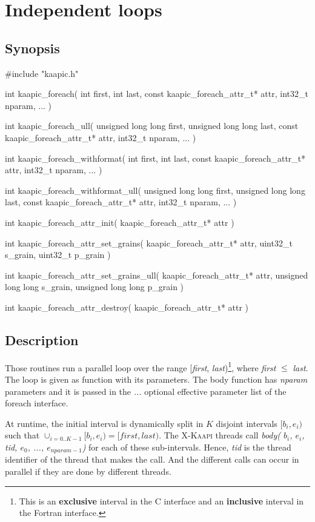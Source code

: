 \documentclass[a4paper, 11pt]{article}
\makeatletter
\newenvironment{apisection}[2][noshortnameprovided]{%
  \newpage
  \section{#2}
  \label{api@#1}
  \newcommand{\api@newpart}[4][noshortpartnameprovided]{%
    \newenvironment{##1}{%
      \subsection{##2}%
      \label{api@#1@##1}%
      ##3%
    }{##4}%
  }%
  \api@newpart[synopsis]{Synopsis}{}{}%
  \api@newpart[call]{Call}{}{}%
  \api@newpart[desc]{Description}{}{}%
  \api@newpart[params]{Parameters}{%
    \let\api@indesc\@empty
    \newcommand{\param}[1]{%
      \def\api@indesc{yes}%
      \begin{description}%
        \renewcommand{\param}[1]{\item[########1]}%
      \item[####1]
      }%
      \newenvironment{parameters}{%
        \begin{description}%
          \renewcommand{\param}[1]{\item[########1]}%
        }{%
        \end{description}%
      }
    }{%
      \ifx\api@indesc\@empty\relax\else%
    \end{description}%
    \fi%
  }%
  \api@newpart[ret]{Return value}{%
    \newcommand{\otherret}{\par\medskip\noindent}%
  }{}%
  \api@newpart[example]{Example}{}{}%
}{}
\newcommand{\kaapi}{\textsc{X-Kaapi}\xspace}
\makeatother
\begin{document}
\begin{apisection}[loop]{Independent loops}

  \begin{synopsis}
    \begin{code}
#include "kaapic.h"

int kaapic_foreach( 
  int first, 
  int last,
  const kaapic_foreach_attr_t* attr,
  int32_t nparam,
  ...
 ) 

int kaapic_foreach_ull( 
  unsigned long long first, 
  unsigned long long last,
  const kaapic_foreach_attr_t* attr,
  int32_t nparam,
  ...
 ) 

int kaapic_foreach_withformat( 
  int first, 
  int last,
  const kaapic_foreach_attr_t* attr,
  int32_t nparam,
  ...
 ) 
 
int kaapic_foreach_withformat_ull( 
  unsigned long long first, 
  unsigned long long last,
  const kaapic_foreach_attr_t* attr,
  int32_t nparam,
  ...
 ) 
 
int kaapic_foreach_attr_init(
  kaapic_foreach_attr_t* attr
)

int kaapic_foreach_attr_set_grains(
  kaapic_foreach_attr_t* attr, 
  uint32_t s_grain,
  uint32_t p_grain
)

int kaapic_foreach_attr_set_grains_ull(
  kaapic_foreach_attr_t* attr, 
  unsigned long long s_grain,
  unsigned long long p_grain
)

int kaapic_foreach_attr_destroy(
  kaapic_foreach_attr_t* attr
)
    \end{code}
  \end{synopsis}

  \begin{desc}
    Those routines run a parallel loop over the range [\textit{first},
    \textit{last})\footnote{This is an \textbf{exclusive} interval in
      the C interface and an \textbf{inclusive} interval in the
      Fortran interface.}, where \textit{first} $\leq$ \textit{last}.  
    The loop is given as function with its
    parameters. The body function has \textit{nparam} parameters and
    it is passed in the \textit{...} optional effective parameter list
    of the foreach interface.

    At runtime, the initial interval is dynamically split in $K$
    disjoint intervals $[b_i, e_i)$ such that $\cup_{i=0..K-1} [b_i,
    e_i) = [first, last)$. The \kaapi threads call \textit{body(
      $b_i$, $e_i$, tid, $e_0$, ..., $e_{nparam-1}$)} for each of
    these sub-intervals. Hence, \textit{tid} is the thread identifier
    of the thread that makes the call. And the different calls can
    occur in parallel if they are done by different threads.


\end{desc}
\end{apisection}
\end{document}

